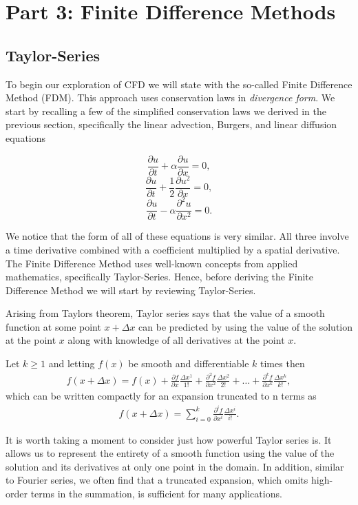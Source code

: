 \part{Part 3: Finite Difference Methods}


\chapter{Taylor-Series}
To begin our exploration of CFD we will state with the so-called Finite Difference Method (FDM). This approach uses conservation laws in {\it divergence form}. We start by recalling a few of the simplified conservation laws we derived in the previous section, specifically the linear advection, Burgers, and linear diffusion equations
\begin{eqBox}
\begin{equation}
	\frac{\partial u}{\partial t} +  \alpha \frac{\partial u}{\partial x} = 0,
\end{equation}
\begin{equation}
	\frac{\partial u}{\partial t} +  \frac{1}{2} \frac{\partial u^2}{\partial x} = 0,
\end{equation}
\begin{equation}
	\frac{\partial u}{\partial t} - \alpha \frac{\partial^2 u}{\partial x^2} = 0.
\end{equation}
\end{eqBox}
We notice that the form of all of these equations is very similar. All three involve a time derivative combined with a coefficient multiplied by a spatial derivative. The Finite Difference Method uses well-known concepts from applied mathematics, specifically Taylor-Series. Hence, before deriving the Finite Difference Method we will start by reviewing Taylor-Series.

Arising from Taylors theorem, Taylor series says that the value of a smooth function at some point $x + \Delta x$ can be predicted by using the value of the solution at the point $x$ along with knowledge of all derivatives at the point $x$.
\begin{theorem}
Let $k \geq 1$ and letting $f(x)$ be smooth and differentiable $k$ times then
\begin{align}
f(x + \Delta x) = f(x) + \frac{\partial f}{\partial x}\frac{\Delta x^1}{1!} + \frac{\partial^2 f}{\partial x^2}\frac{\Delta x^2}{2!} + \hdots + \frac{\partial^k f}{\partial x^k}\frac{\Delta x^k}{k!},
\end{align}
which can be written compactly for an expansion truncated to n terms as
\begin{align}
f(x + \Delta x) = \sum_{i=0}^{k} \frac{\partial^i f}{\partial x^i}\frac{\Delta x^i}{i!}.
\end{align}
\end{theorem}
It is worth taking a moment to consider just how powerful Taylor series is. It allows us to represent the entirety of a smooth function using the value of the solution and its derivatives at only one point in the domain. In addition, similar to Fourier series, we often find that a truncated expansion, which omits high-order terms in the summation, is sufficient for many applications.

